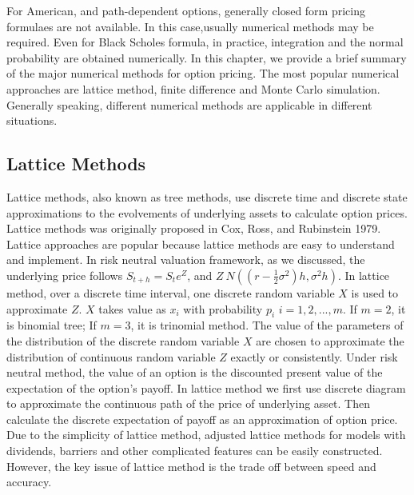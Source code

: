 \documentclass[11pt]{book}
\begin{document}
For American, and path-dependent options, generally closed form pricing formulaes are not available. In this case,usually numerical methods may be required. Even for Black Scholes formula, in practice, integration and the normal probability are obtained numerically. In this chapter, we provide a brief summary of the major numerical methods for option pricing. The most popular numerical approaches are lattice method, finite difference and Monte Carlo simulation. Generally speaking, different numerical methods are applicable in different situations. 
\subsection{Lattice Methods}
Lattice methods, also known as tree methods, use discrete time and discrete state approximations to the evolvements of underlying assets to calculate option prices. Lattice methods was originally proposed in
Cox, Ross, and Rubinstein 1979. Lattice approaches are popular because lattice methods are easy to understand and implement. In risk neutral valuation framework, as we discussed, the underlying price follows $S_{t+h} = S_t e^{Z}$, and $Z ~ N((r-\frac{1}{2} \sigma ^2)h,\sigma ^2 h)$. In lattice method, over a discrete time interval, one discrete random variable $X$ is used to approximate $Z$. $X$ takes value as $x_i$ with probability $p_i$ $i=1,2,...,m$. If $m=2$, it is binomial tree; If $m=3$, it is trinomial method. The value of the parameters of the distribution of the discrete random variable $X$ are chosen to approximate the distribution of continuous random variable $Z$ exactly or consistently. Under risk neutral method, the value of an option is the discounted present value of the expectation of the option's payoff. In lattice method we first use discrete diagram to approximate the continuous path of the price of underlying asset. Then calculate the discrete expectation of payoff as an approximation of option price. Due to the simplicity of lattice method, adjusted lattice methods for models with dividends, barriers and other complicated features can be easily constructed. However, the key issue of lattice method is the trade off between speed and accuracy. 




\end{document}
